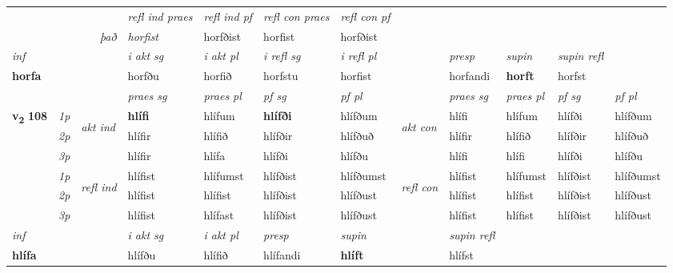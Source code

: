 \begin{longtable}[l]{X>{\footnotesize\itshape}llXXXXlXXXX}
\cmidrule{4-7}
 & && \textit{refl ind praes} & \textit{refl ind pf} & \textit{refl con praes} & \textit{refl con pf} \\*
\multicolumn{3}{r}{\textit{það}}& horfist & horfðist & horfist & horfðist \\*

\cmidrule{4-7}
   {\textit{inf}} & &  & \textit{i akt sg} & \textit{i akt pl} & \textit{i refl sg} & \textit{i refl pl} && \textit{presp} & \textit{supin} & \textit{supin refl}  \\*
  {\textbf{horfa}} & && horfðu  & horfið & horfstu & horfist && horfandi &  \textbf{horft} & horfst  \\*

\midrule

 & &   & \textit{praes sg}  & \textit{praes pl}    & \textit{ pf sg} & \textit{pf pl} & & \textit{praes sg}  & \textit{praes pl}    & \textit{pf sg} & \textit{pf pl }  \\ \cmidrule{4-7} \cmidrule{9-12}
 \multirow{2}{*}{{{\textbf{v{\textsubscript{2}}} \Large{\textbf{108}}}}}  & 1p & \multirow{3}{*}{\begin{turn}{90}\textit{akt ind}\end{turn}} & \textbf{hlífi} & hlífum & \textbf{hlífði} & hlífðum & \multirow{3}{*}{\begin{turn}{90}\textit{akt con}\end{turn}} &hlífi & hlífum & hlífði & hlífðum\\*
 & 2p &  &  hlífir  & hlífið & hlífðir & hlífðuð & & hlífir & hlífið & hlífðir & hlífðuð \\*
 & 3p &  & hlífir & hlífa & hlífði & hlífðu & & hlífi & hlífi& hlífði & hlífðu \\*
\cmidrule{4-7} \cmidrule{9-12}
 & 1p & \multirow{3}{*}{\begin{turn}{90}\textit{refl ind}\end{turn}}  & hlífist & hlífumst & hlífðist & hlífðumst & \multirow{3}{*}{\begin{turn}{90}\textit{refl con}\end{turn}}  &hlífist & hlífumst & hlífðist & hlífðumst \\*
 & 2p &  & hlífist & hlífist & hlífðist & hlífðust & &hlífist & hlífist & hlífðist & hlífðust \\*
 & 3p  & & hlífist & hlífast & hlífðist & hlífðust & & hlífist & hlífist& hlífðist & hlífðust \\*
\cmidrule{4-7} \cmidrule{9-12}

   {\textit{inf}} & &  & \textit{i akt sg} & \textit{i akt pl}   & \textit{presp} & \textit{supin} && \textit{supin refl}  \\*
  {\textbf{hlífa}} & && hlífðu  & hlífið   & hlífandi &  \textbf{hlíft} && hlífst  \\*


\end{longtable}
